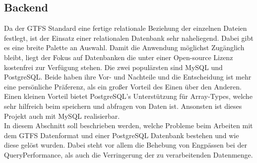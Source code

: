 \subsection{Backend}
\label{sub:backend}
  Da der GTFS Standard eine fertige relationale Beziehung der einzelnen Dateien festlegt, ist der Einsatz einer relationalen Datenbank sehr naheliegend. Dabei gibt es eine breite Palette an Auswahl. Damit die Anwendung möglichst Zugänglich bleibt, liegt der Fokus auf Datenbanken die unter einer Open-source Lizenz kostenfrei zur Verfügung stehen. Die zwei populärsten sind MySQL und PostgreSQL\parencite{db_engines}. Beide haben ihre Vor- und Nachteile und die Entscheidung ist mehr eine persönliche Präferenz, als ein großer Vorteil des Einen über den Anderen. Einen kleinen Vorteil bietet PostgreSQL's Unterstützung für Array-Types, welche sehr hilfreich beim speichern und abfragen von Daten ist. Ansonsten ist dieses Projekt auch mit MySQL realisierbar.\\

  In diesem Abschnitt soll beschrieben werden, welche Probleme beim Arbeiten mit dem GTFS Datenformat und einer PostgreSQL Datenbank bestehen und wie diese gelöst wurden. Dabei steht vor allem die Behebung von Engpässen bei der Query\footnotemark Performance, als auch die Verringerung der zu verarbeitenden Datenmenge.

  

  
  
  
  
  
  
  
